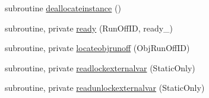 \begin{DoxyCompactItemize}
subroutine \mbox{\hyperlink{namespacemodulerunoff_ad9192dfb595b8f16119a042aa13d95c4}{deallocateinstance}} ()
\item 
subroutine, private \mbox{\hyperlink{namespacemodulerunoff_aee0c5b22d517afda2e934847c9da42cb}{ready}} (Run\+Off\+ID, ready\+\_\+)
\item 
subroutine, private \mbox{\hyperlink{namespacemodulerunoff_a573ec5acc76c43856a82166862259a60}{locateobjrunoff}} (Obj\+Run\+Off\+ID)
\item 
subroutine, private \mbox{\hyperlink{namespacemodulerunoff_ae46242484733cacdd1c5d484f4e6eba7}{readlockexternalvar}} (Static\+Only)
\item 
subroutine, private \mbox{\hyperlink{namespacemodulerunoff_a900316fc0130b378405b9b03d84eb9cd}{readunlockexternalvar}} (Static\+Only)
\end{DoxyCompactItemize}
